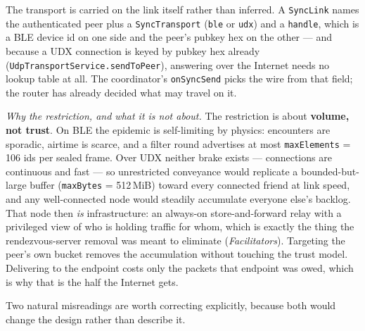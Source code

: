 \documentclass[11pt]{report}
\newcommand{\code}[1]{\texttt{\small #1}}
\begin{document}
The transport is carried on the link itself rather than inferred. A \code{SyncLink} names the authenticated peer plus a \code{SyncTransport} (\code{ble} or \code{udx}) and a \code{handle}, which is a BLE device id on one side and the peer's pubkey hex on the other --- and because a UDX connection is keyed by pubkey hex already (\code{UdpTransportService.sendToPeer}), answering over the Internet needs no lookup table at all. The coordinator's \code{onSyncSend} picks the wire from that field; the router has already decided what may travel on it.

\emph{Why the restriction, and what it is not about.} The restriction is about \textbf{volume, not trust}. On BLE the epidemic is self-limiting by physics: encounters are sporadic, airtime is scarce, and a filter round advertises at most \code{maxElements} = 106 ids per sealed frame. Over UDX neither brake exists --- connections are continuous and fast --- so unrestricted conveyance would replicate a bounded-but-large buffer (\code{maxBytes} = 512\,MiB) toward every connected friend at link speed, and any well-connected node would steadily accumulate everyone else's backlog. That node then \emph{is} infrastructure: an always-on store-and-forward relay with a privileged view of who is holding traffic for whom, which is exactly the thing the rendezvous-server removal was meant to eliminate (\emph{Facilitators}). Targeting the peer's own bucket removes the accumulation without touching the trust model. Delivering to the endpoint costs only the packets that endpoint was owed, which is why that is the half the Internet gets.

Two natural misreadings are worth correcting explicitly, because both would change the design rather than describe it.
\end{document}
